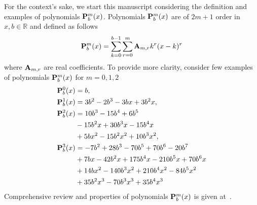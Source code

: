﻿For the context's sake, we start this manuscript considering the definition and examples of polynomials ${\mathbf{P}}\sp{m} \sb{b}(x)$.
Polynomials ${\mathbf{P}}\sp{m} \sb{b}(x)$ are of $2m+1$ order in $x,b \in \mathbb{R}$ and defined as follows
\begin{equation}
    {\mathbf{P}}\sp{m} \sb{b}(x) = \sum_{k=0}^{b-1} \sum_{r=0}^{m} {\mathbf{A}} \sb{m,r} k^r(x-k)^r
    \label{eq:definition_polynomial_p}
\end{equation}
where ${\mathbf{A}} \sb{m,r}$ are real coefficients.
To provide more clarity, consider few examples of polynomials ${\mathbf{P}}\sp{m} \sb{b}(x)$ for $m=0,1,2$
\begin{equation*}
    \begin{split}
        {\mathbf{P}}\sp{0} \sb{b}(x)
        &=b, \\
        {\mathbf{P}}\sp{1} \sb{b}(x)
        &=3 b^2 - 2 b^3 - 3 b x + 3 b^2 x, \\
        {\mathbf{P}}\sp{2} \sb{b}(x)
        &=10 b^3 - 15 b^4 + 6 b^5 \\
        &- 15 b^2 x + 30 b^3 x - 15 b^4 x \\
        &+ 5 b x^2 - 15 b^2 x^2 + 10 b^3 x^2, \\
        {\mathbf{P}}\sp{3} \sb{b}(x)
        &=-7 b^2 + 28 b^3 - 70 b^5 + 70 b^6 - 20 b^7 \\
        &+ 7 b x - 42 b^2 x + 175 b^4 x - 210 b^5 x + 70 b^6 x \\
        &+ 14 b x^2 - 140 b^3 x^2 + 210 b^4 x^2 - 84 b^5 x^2 \\
        &+ 35 b^2 x^3 - 70 b^3 x^3 + 35 b^4 x^3
    \end{split}
\end{equation*}
Comprehensive review and properties of polynomials ${\mathbf{P}}\sp{m} \sb{b}(x)$ is given at~\cite{kolosov2016link}.
